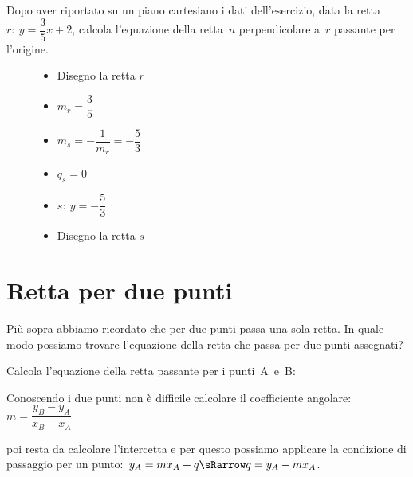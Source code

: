  \begin{esempio}
Dopo aver riportato su un piano cartesiano i dati dell'esercizio,
data la retta~\(r:~y = \dfrac{3}{5} x +2\), calcola l'equazione della 
retta~\(n\) perpendicolare a~\(r\) passante per l'origine.

\begin{inaccessibleblock}
 \begin{figure}[h]
 \centering
 \begin{minipage}[]{.30\textwidth}
  \begin{itemize}
  \item Disegno la retta \(r\)
  \item \(m_r = \dfrac{3}{5}\)
  \item \(m_s = - \dfrac{1}{m_r} = -\dfrac{5}{3}\)
  \item \(q_s = 0\)
  \item \(s:~ y= -\dfrac{5}{3}\)
  \item Disegno la retta \(s\)
  \end{itemize}
 \end{minipage}
 \begin{minipage}[]{.60\textwidth}
   \centering \esempioperp
 \end{minipage}
\label{fig:metodorapido}
\end{figure}
\end{inaccessibleblock}
 \end{esempio}


\section{Retta per due punti}
\label{sec:retta_rettaperduepunti}

Più sopra abbiamo ricordato che per due punti passa una sola retta. 
In quale modo possiamo trovare l'equazione della retta che passa per due 
punti assegnati?

\begin{procedura}
 Calcola l'equazione della retta passante per i punti~A~e~B:
 \begin{enumeratea}
  \item Conoscendo i due punti non è difficile calcolare il coefficiente 
   angolare:~\(m = \dfrac{y_B - y_A}{x_B - x_A}\)
  \item poi resta da calcolare l'intercetta e per questo possiamo applicare 
   la condizione di passaggio per un 
   punto:~\(y_A = m x_A + q \sRarrow q = y_A - m x_A\).
 \end{enumeratea}
\end{procedura}



